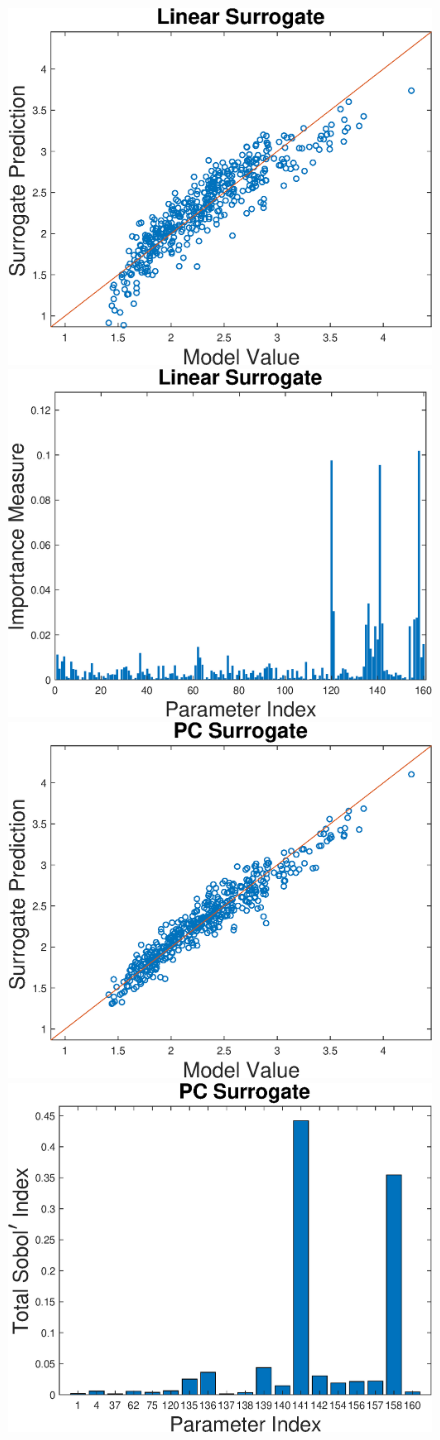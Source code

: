 \begin{figure}[h]
\centering
\includegraphics[width=.46 \textwidth]{Figures/Vol_Flow_QoI_LR_Prediction_Experimental.eps}
\hspace{.1 cm}
\includegraphics[width=.475 \textwidth]{Figures/Vol_Flow_QoI_LR_VI_Experimental.eps} \\
\vspace{.2 cm}
\includegraphics[width=.46 \textwidth]{Figures/Vol_Flow_QoI_PCE_Prediction_Experimental.eps}
\hspace{.1 cm}
\includegraphics[width=.475 \textwidth]{Figures/Vol_Flow_QoI_PCE_SI_Experimental.eps}

\end{figure}
